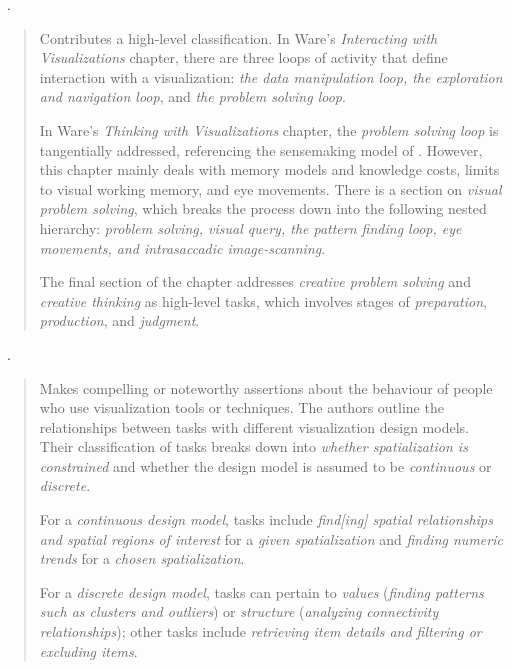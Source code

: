 \begin{sloppypar}
~\cite{Ware2004}. \end{sloppypar}

\begin{quotation}
    Contributes a high-level classification.
    In Ware's {\it Interacting with Visualizations} chapter, there are three loops of activity that define interaction with a visualization: {\it the data manipulation loop, the exploration and navigation loop}, and {\it the problem solving loop}. 
    
    In Ware's {\it Thinking with Visualizations} chapter, the {\it problem solving loop} is tangentially addressed, referencing the sensemaking model of \citet{Pirolli2005}.
    However, this chapter mainly deals with memory models and knowledge costs, limits to visual working memory, and eye movements. 
    There is a section on {\it visual problem solving}, which breaks the process down into the following nested hierarchy: {\it problem solving, visual query, the pattern finding loop, eye movements, and intrasaccadic image-scanning}.
    
    The final section of the chapter addresses {\it creative problem solving} and {\it creative thinking} as high-level tasks, which involves stages of {\it preparation}, {\it production}, and {\it judgment}.
\end{quotation}

\begin{sloppypar}
~\cite{Tory2004}. \end{sloppypar}

\begin{quotation}
    Makes compelling or noteworthy assertions about the behaviour of people who use visualization tools or techniques.
    The authors outline the relationships between tasks with different visualization design models. 
    Their classification of tasks breaks down into {\it whether spatialization is constrained} and whether the design model is assumed to be {\it continuous} or {\it discrete}.
    
    For a {\it continuous design model}, tasks include {\it find[ing] spatial relationships and spatial regions of interest} for a {\it given spatialization} and	{\it finding numeric trends} for a {\it chosen spatialization}.
    
    For a {\it discrete design model}, tasks can pertain to {\it values} ({\it finding patterns such as clusters and outliers}) or {\it structure} ({\it analyzing connectivity relationships}); other tasks include {\it retrieving item details and filtering or excluding items}.
\end{quotation}

